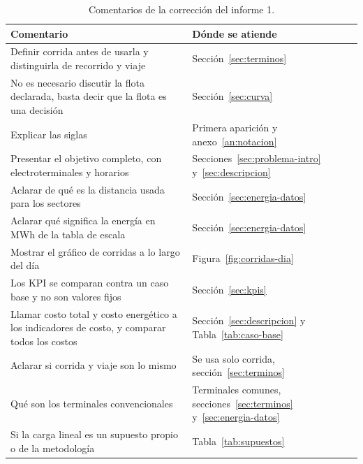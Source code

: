 \begin{table}[H]
\centering
\caption{Comentarios de la corrección del informe 1.}
\label{tab:corr-informe1}
\footnotesize
\begin{tabularx}{\textwidth}{@{}X p{5.2cm}@{}}
\toprule
Comentario & Dónde se atiende \\
\midrule
Definir corrida antes de usarla y distinguirla de recorrido y viaje & Sección~\ref{sec:terminos} \\ %
No es necesario discutir la flota declarada, basta decir que la flota es una decisión & Sección~\ref{sec:curva} \\
Explicar las siglas & Primera aparición y anexo~\ref{an:notacion} \\
Presentar el objetivo completo, con electroterminales y horarios & Secciones~\ref{sec:problema-intro} y~\ref{sec:descripcion} \\
Aclarar de qué es la distancia usada para los sectores & Sección~\ref{sec:energia-datos} \\
Aclarar qué significa la energía en MWh de la tabla de escala & Sección~\ref{sec:energia-datos} \\
Mostrar el gráfico de corridas a lo largo del día & Figura~\ref{fig:corridas-dia} \\
Los KPI se comparan contra un caso base y no son valores fijos & Sección~\ref{sec:kpis} \\
Llamar costo total y costo energético a los indicadores de costo, y comparar todos los costos & Sección~\ref{sec:descripcion} y Tabla~\ref{tab:caso-base} \\
Aclarar si corrida y viaje son lo mismo & Se usa solo corrida, sección~\ref{sec:terminos} \\ %
Qué son los terminales convencionales & Terminales comunes, secciones~\ref{sec:terminos} y~\ref{sec:energia-datos} \\
Si la carga lineal es un supuesto propio o de la metodología & Tabla~\ref{tab:supuestos} \\
\bottomrule
\end{tabularx}
\end{table}
